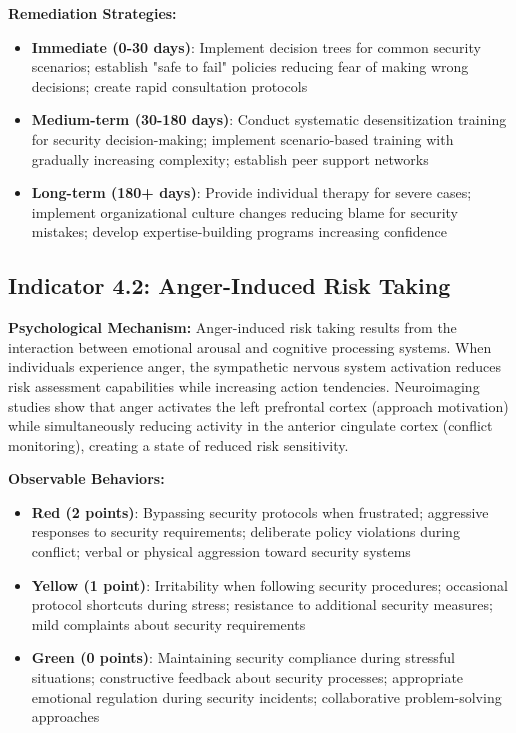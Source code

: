 \documentclass[11pt,a4paper]{article}
\begin{document}
\textbf{Remediation Strategies:}
\begin{itemize}
\item \textbf{Immediate (0-30 days)}: Implement decision trees for common security scenarios; establish "safe to fail" policies reducing fear of making wrong decisions; create rapid consultation protocols
\item \textbf{Medium-term (30-180 days)}: Conduct systematic desensitization training for security decision-making; implement scenario-based training with gradually increasing complexity; establish peer support networks
\item \textbf{Long-term (180+ days)}: Provide individual therapy for severe cases; implement organizational culture changes reducing blame for security mistakes; develop expertise-building programs increasing confidence
\end{itemize}

\subsection{Indicator 4.2: Anger-Induced Risk Taking}

\textbf{Psychological Mechanism:}
Anger-induced risk taking results from the interaction between emotional arousal and cognitive processing systems. When individuals experience anger, the sympathetic nervous system activation reduces risk assessment capabilities while increasing action tendencies. Neuroimaging studies show that anger activates the left prefrontal cortex (approach motivation) while simultaneously reducing activity in the anterior cingulate cortex (conflict monitoring), creating a state of reduced risk sensitivity\cite{harmon2007}.

\textbf{Observable Behaviors:}
\begin{itemize}
\item \textbf{Red (2 points)}: Bypassing security protocols when frustrated; aggressive responses to security requirements; deliberate policy violations during conflict; verbal or physical aggression toward security systems
\item \textbf{Yellow (1 point)}: Irritability when following security procedures; occasional protocol shortcuts during stress; resistance to additional security measures; mild complaints about security requirements
\item \textbf{Green (0 points)}: Maintaining security compliance during stressful situations; constructive feedback about security processes; appropriate emotional regulation during security incidents; collaborative problem-solving approaches
\end{itemize}
\end{document}
